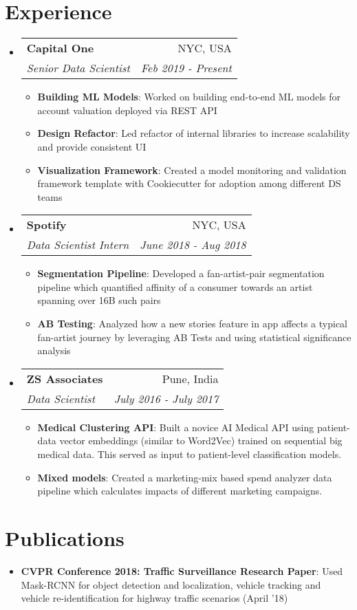 \documentclass[a4paper,20pt]{article}
\makeatletter
\newcommand{\resumeItem}[2]{
  \item\small{
    \textbf{#1}{: #2 \vspace{-2pt}}
  }
}
\newcommand{\resumeSubheading}[4]{
  \vspace{-1pt}\item
    \begin{tabular*}{0.97\textwidth}{l@{\extracolsep{\fill}}r}
      \textbf{#1} & #2 \\
      \textit{#3} & \textit{#4} \\
    \end{tabular*}\vspace{-5pt}
}
\newcommand{\resumeSubItem}[2]{\resumeItem{#1}{#2}\vspace{-3pt}}
\newcommand{\resumeSubHeadingListStart}{\begin{itemize}[leftmargin=*]}
\newcommand{\resumeSubHeadingListEnd}{\end{itemize}}
\newcommand{\resumeItemListStart}{\begin{itemize}}
\newcommand{\resumeItemListEnd}{\end{itemize}\vspace{-5pt}}
\makeatother
\begin{document}
\section{Experience}
  \resumeSubHeadingListStart
    \resumeSubheading{Capital One}{NYC, USA}
    {Senior Data Scientist}{Feb 2019 - Present}
    \resumeItemListStart
        \resumeItem{Building ML Models}
          {Worked on building end-to-end ML models for account valuation deployed via REST API}
          \resumeItem{Design Refactor}
          {Led refactor of internal libraries to increase scalability and provide consistent UI}
          \resumeItem{Visualization Framework}{Created a model monitoring and validation framework template with Cookiecutter for adoption among different DS teams}
      \resumeItemListEnd

\vspace{5pt}
    \resumeSubheading
		{Spotify}{NYC, USA}
		{Data Scientist Intern}{June 2018 -  Aug 2018}
		\resumeItemListStart
        \resumeItem{Segmentation Pipeline}
          {Developed a fan-artist-pair segmentation pipeline which quantified affinity of a consumer towards an artist spanning over 16B such pairs}
        \resumeItem{AB Testing}
          {Analyzed how a new stories feature in app affects a typical fan-artist journey by leveraging AB Tests and using statistical significance analysis}
		\resumeItemListEnd

\vspace{5pt}
    \resumeSubheading
		{ZS Associates}{Pune, India}
		{Data Scientist}{July 2016 -  July 2017}
		\resumeItemListStart
        \resumeItem{Medical Clustering API}
          {Built a novice AI Medical API using patient-data vector embeddings (similar to Word2Vec) trained on sequential big medical data. This served as input to patient-level classification models.}
        \resumeItem{Mixed models}
          {Created a marketing-mix based spend analyzer data pipeline which calculates impacts of different marketing campaigns.}
		\resumeItemListEnd

\resumeSubHeadingListEnd


\vspace{-5pt}
\section{Publications}
\resumeSubHeadingListStart
\resumeSubItem{CVPR Conference 2018: Traffic Surveillance Research Paper}{Used Mask-RCNN for object detection and localization, vehicle tracking and vehicle re-identification for highway traffic scenarios (April '18)}
\vspace{2pt}
\resumeSubHeadingListEnd
\vspace{-5pt}
\end{document}
